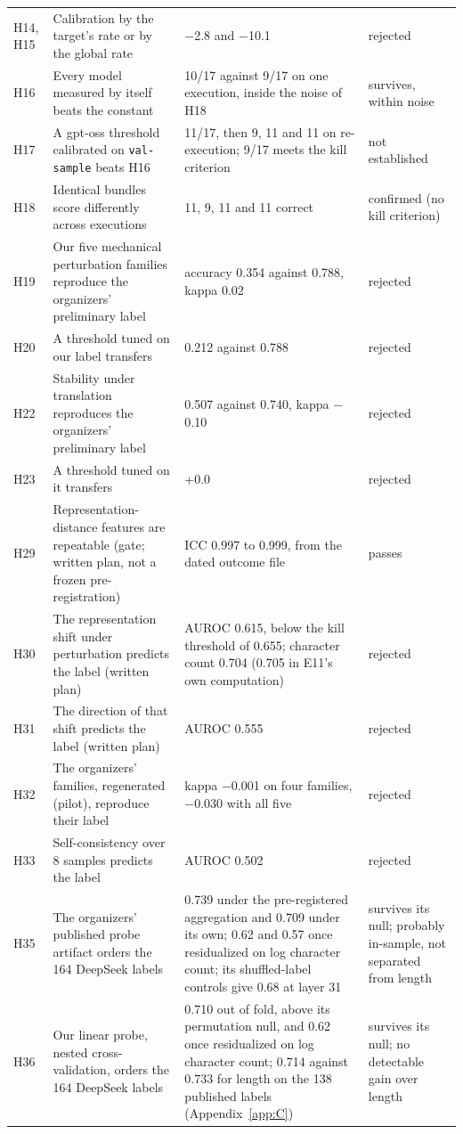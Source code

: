 {\begin{longtable}{L{1.1cm}L{3.9cm}L{5.6cm}L{2.0cm}}
H14, H15 & Calibration by the target's rate or by the global rate & $-$2.8 and $-$10.1 & rejected \\
H16 & Every model measured by itself beats the constant & 10/17 against 9/17 on one execution, inside the noise of H18 & survives, within noise \\
H17 & A gpt-oss threshold calibrated on \texttt{val-sample} beats H16 & 11/17, then 9, 11 and 11 on re-execution; 9/17 meets the kill criterion & not established \\
H18 & Identical bundles score differently across executions & 11, 9, 11 and 11 correct & confirmed (no kill criterion) \\
H19 & Our five mechanical perturbation families reproduce the organizers' preliminary label & accuracy 0.354 against 0.788, kappa 0.02 & rejected \\
H20 & A threshold tuned on our label transfers & 0.212 against 0.788 & rejected \\
H22 & Stability under translation reproduces the organizers' preliminary label & 0.507 against 0.740, kappa $-$0.10 & rejected \\
H23 & A threshold tuned on it transfers & +0.0 & rejected \\
H29 & Representation-distance features are repeatable (gate; written plan, not a frozen pre-registration) & ICC 0.997 to 0.999, from the dated outcome file & passes \\
H30 & The representation shift under perturbation predicts the label (written plan) & AUROC 0.615, below the kill threshold of 0.655; character count 0.704 (0.705 in E11's own computation) & rejected \\
H31 & The direction of that shift predicts the label (written plan) & AUROC 0.555 & rejected \\
H32 & The organizers' families, regenerated (pilot), reproduce their label & kappa $-$0.001 on four families, $-$0.030 with all five & rejected \\
H33 & Self-consistency over 8 samples predicts the label & AUROC 0.502 & rejected \\
H35 & The organizers' published probe artifact orders the 164 DeepSeek labels & 0.739 under the pre-registered aggregation and 0.709 under its own; 0.62 and 0.57 once residualized on log character count; its shuffled-label controls give 0.68 at layer 31 & survives its null; probably in-sample, not separated from length \\
H36 & Our linear probe, nested cross-validation, orders the 164 DeepSeek labels & 0.710 out of fold, above its permutation null, and 0.62 once residualized on log character count; 0.714 against 0.733 for length on the 138 published labels (Appendix~\ref{app:C}) & survives its null; no detectable gain over length \\

\end{longtable}}
